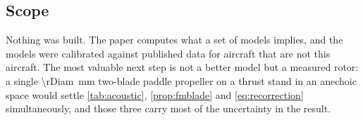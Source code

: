 \subsection{Scope}

Nothing was built. The paper computes what a set of models implies, and the
models were calibrated against published data for aircraft that are not this
aircraft. The most valuable next step is not a better model but a measured
rotor: a single \SI{\rDiam}{\milli\metre} two-blade paddle propeller on a
thrust stand in an anechoic space would settle \cref{tab:acoustic},
\cref{prop:fmblade} and \cref{eq:recorrection} simultaneously, and those three
carry most of the uncertainty in the result.
